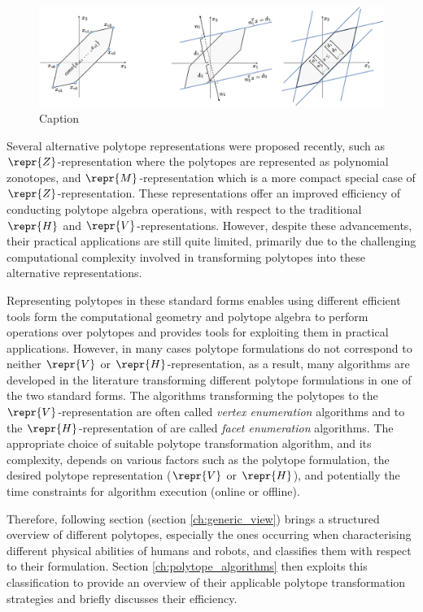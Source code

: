 \begin{figure}[!t]
    \centering
    \includegraphics[width=\linewidth]{Chapters/imgs/h_v_rep.pdf}
    \caption{Caption}
    \label{fig:hv_rep}
\end{figure}

Several alternative polytope representations were proposed recently, such as $\repr{Z}$-representation \cite{kochdumper2019representation} where the polytopes are represented as polynomial zonotopes, and $\repr{M}$-representation \cite{sigl2023mrepresentation} which is a more compact special case of $\repr{Z}$-representation. These representations offer an improved efficiency of conducting polytope algebra operations, with respect to the traditional $\repr{H}$ and $\repr{V}$-representations. However, despite these advancements, their practical applications are still quite limited, primarily due to the challenging computational complexity involved in transforming polytopes into these alternative representations. 

Representing polytopes in these standard forms enables using different efficient tools form the computational geometry and polytope algebra to perform operations over polytopes and provides tools for exploiting them in practical applications. However, in many cases polytope formulations do not correspond to neither $\repr{V}$ or $\repr{H}$-representation, as a result, many algorithms are developed in the literature transforming different polytope formulations in one of the two standard forms. The algorithms transforming the polytopes to the $\repr{V}$-representation are often called \textit{vertex enumeration} algorithms and to the $\repr{H}$-representation of are called \textit{facet enumeration} algorithms\cite{bremner_fukuda_marzetta_1998}. The appropriate choice of suitable polytope transformation algorithm, and its complexity, depends on various factors such as the polytope formulation, the desired polytope representation ($\repr{V}$ or $\repr{H}$), and potentially the time constraints for algorithm execution (online or offline). 

Therefore, following section (section \ref{ch:generic_view}) brings a structured overview of different polytopes, especially the ones occurring when characterising different physical abilities of humans and robots, and classifies them with respect to their formulation. Section \ref{ch:polytope_algorithms} then exploits this classification to provide an overview of their applicable polytope transformation strategies and briefly discusses their efficiency.

